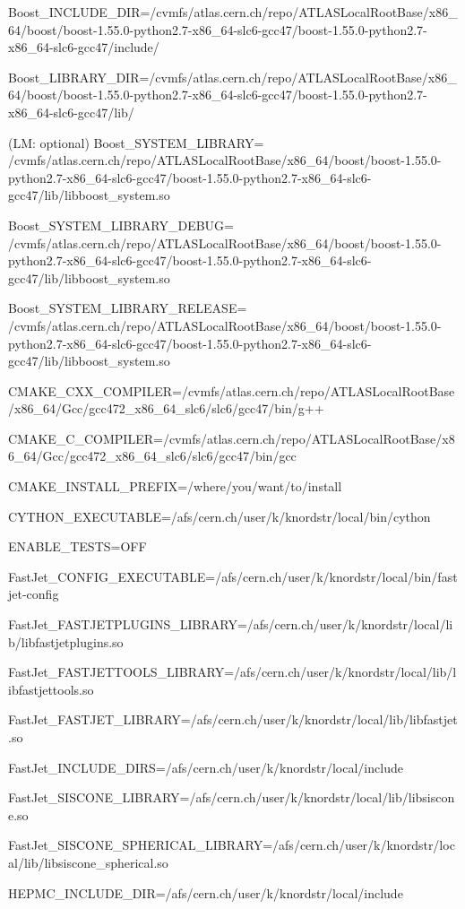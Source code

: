 Boost_INCLUDE_DIR=/cvmfs/atlas.cern.ch/repo/ATLASLocalRootBase/x86_64/boost/boost-1.55.0-python2.7-x86_64-slc6-gcc47/boost-1.55.0-python2.7-x86_64-slc6-gcc47/include/

Boost_LIBRARY_DIR=/cvmfs/atlas.cern.ch/repo/ATLASLocalRootBase/x86_64/boost/boost-1.55.0-python2.7-x86_64-slc6-gcc47/boost-1.55.0-python2.7-x86_64-slc6-gcc47/lib/

(LM: optional) Boost_SYSTEM_LIBRARY=
/cvmfs/atlas.cern.ch/repo/ATLASLocalRootBase/x86_64/boost/boost-1.55.0-python2.7-x86_64-slc6-gcc47/boost-1.55.0-python2.7-x86_64-slc6-gcc47/lib/libboost_system.so

Boost_SYSTEM_LIBRARY_DEBUG=
/cvmfs/atlas.cern.ch/repo/ATLASLocalRootBase/x86_64/boost/boost-1.55.0-python2.7-x86_64-slc6-gcc47/boost-1.55.0-python2.7-x86_64-slc6-gcc47/lib/libboost_system.so
 

Boost_SYSTEM_LIBRARY_RELEASE=
/cvmfs/atlas.cern.ch/repo/ATLASLocalRootBase/x86_64/boost/boost-1.55.0-python2.7-x86_64-slc6-gcc47/boost-1.55.0-python2.7-x86_64-slc6-gcc47/lib/libboost_system.so

CMAKE_CXX_COMPILER=/cvmfs/atlas.cern.ch/repo/ATLASLocalRootBase/x86_64/Gcc/gcc472_x86_64_slc6/slc6/gcc47/bin/g++

CMAKE_C_COMPILER=/cvmfs/atlas.cern.ch/repo/ATLASLocalRootBase/x86_64/Gcc/gcc472_x86_64_slc6/slc6/gcc47/bin/gcc

CMAKE_INSTALL_PREFIX=/where/you/want/to/install

CYTHON_EXECUTABLE=/afs/cern.ch/user/k/knordstr/local/bin/cython

ENABLE_TESTS=OFF

FastJet_CONFIG_EXECUTABLE=/afs/cern.ch/user/k/knordstr/local/bin/fastjet-config

FastJet_FASTJETPLUGINS_LIBRARY=/afs/cern.ch/user/k/knordstr/local/lib/libfastjetplugins.so

FastJet_FASTJETTOOLS_LIBRARY=/afs/cern.ch/user/k/knordstr/local/lib/libfastjettools.so

FastJet_FASTJET_LIBRARY=/afs/cern.ch/user/k/knordstr/local/lib/libfastjet.so

FastJet_INCLUDE_DIRS=/afs/cern.ch/user/k/knordstr/local/include

FastJet_SISCONE_LIBRARY=/afs/cern.ch/user/k/knordstr/local/lib/libsiscone.so

FastJet_SISCONE_SPHERICAL_LIBRARY=/afs/cern.ch/user/k/knordstr/local/lib/libsiscone_spherical.so

HEPMC_INCLUDE_DIR=/afs/cern.ch/user/k/knordstr/local/include

